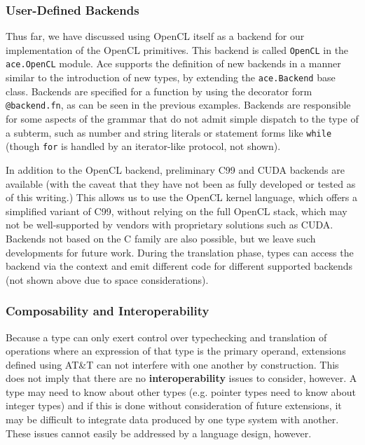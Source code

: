 \documentclass[9pt,preprint]{sigplanconf}
\begin{document}
\subsubsection{User-Defined Backends}\label{backends}
Thus far, we have discussed using OpenCL itself as a backend for our implementation of the OpenCL primitives. This backend is called \verb|OpenCL| in the \verb|ace.OpenCL| module. Ace supports the definition of new backends in a manner similar to the introduction of new types, by extending the \verb|ace.Backend| base class. Backends are specified for a function by using the decorator form \verb|@backend.fn|, as can be seen in the previous examples. 
Backends are responsible for some aspects of the grammar that do not admit simple dispatch to the type of a subterm, such as number and string literals or statement forms like \verb|while| (though \verb|for| is handled by an iterator-like protocol, not shown). 

In addition to the OpenCL backend, preliminary C99 and CUDA backends are available (with the caveat that they have not been as fully developed or tested as of this writing.) This allows us to use the OpenCL kernel language, which offers a simplified variant of C99, without relying on the full OpenCL stack, which may not be well-supported by  vendors with proprietary solutions such as CUDA. Backends not based on the C family are also possible, but we leave such developments for future work. During the translation phase, types can access the backend via the context and emit different code for different supported backends (not shown above due to space considerations).

\subsubsection{Composability and Interoperability}\label{safety}
Because a type can only exert control over typechecking and translation of operations where an expression of that type is the primary operand, extensions defined using AT\&T can not interfere with one another by construction. This does not imply that there are no \textbf{interoperability} issues to consider, however. A type may need to know about other types (e.g. pointer types need to know about integer types) and if this is done without consideration of future extensions, it may be difficult to integrate data produced by one type system with another. These issues cannot easily be addressed by a language design, however.
\end{document}
